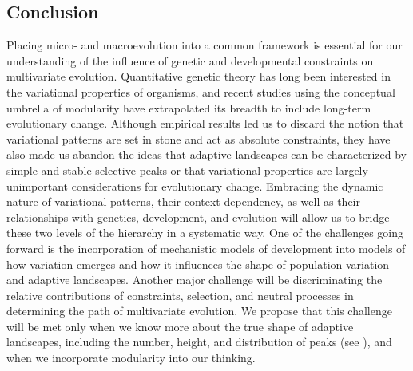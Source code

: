 \begin{refsection}
\section{Conclusion}

Placing micro- and macroevolution into a common framework is essential
for our understanding of the influence of genetic and developmental
constraints on multivariate evolution. Quantitative genetic theory has
long been interested in the variational properties of organisms, and
recent studies using the conceptual umbrella of modularity have
extrapolated its breadth to include long-term evolutionary change.
Although empirical results led us to discard the notion that variational
patterns are set in stone and act as absolute constraints, they have
also made us abandon the ideas that adaptive landscapes can be
characterized by simple and stable selective peaks or that variational
properties are largely unimportant considerations for evolutionary
change. Embracing the dynamic nature of variational patterns, their
context dependency, as well as their relationships with genetics,
development, and evolution will allow us to bridge these two levels of
the hierarchy in a systematic way. One of the challenges going forward
is the incorporation of mechanistic models of development into models of
how variation emerges and how it influences the shape of population
variation and adaptive landscapes. Another major challenge will be
discriminating the relative contributions of constraints, selection, and
neutral processes in determining the path of multivariate evolution. We
propose that this challenge will be met only when we know more about the
true shape of adaptive landscapes, including the number, height, and
distribution of peaks (see \textcite{Laughlin2015-od, Pfaender2016-eb}),
and when we incorporate modularity into our thinking.

\printbibliography

\end{refsection}